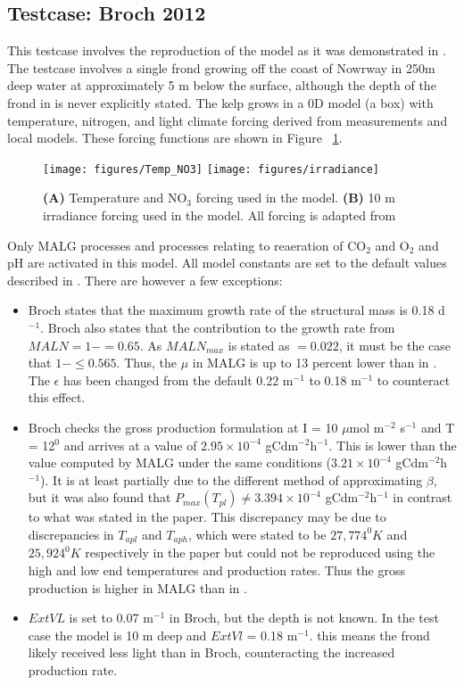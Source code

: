 \documentclass{deltares_manual}
\begin{document}
\subsection{Testcase: Broch 2012}
This testcase involves the reproduction of the model as it was demonstrated in \cite{broch2012}. The testcase involves a single frond growing off the coast of Nowrway in 250m deep water at approximately 5 m below the surface, although the depth of the frond in \cite{broch2012} is never explicitly stated. The kelp grows in a 0D model (a box) with temperature, nitrogen, and light climate forcing derived from measurements and local models. These forcing functions are shown in Figure ~\ref{fig:forcing}.

\begin{figure}[H]
	\centering
	\texttt{[image: figures/Temp\_NO3]}
	\texttt{[image: figures/irradiance]}
	\caption[]{\textbf{(A)} Temperature and NO$_{3}$ forcing used in the model. \textbf{(B)} 10 m irradiance forcing used in the model. All forcing is adapted from \cite{broch2012}}
	\label{fig:forcing}
\end{figure}

Only MALG processes and processes relating to reaeration of CO$_{2}$ and O$_{2}$ and pH are activated in this model. All model constants are set to the default values described in \cite{broch2012}. There are however a few exceptions:
\begin{itemize}
	\item Broch states that the maximum growth rate of the structural mass is 0.18 d$^{-1}$. Broch also states that the contribution to the growth rate from $MALN = 1-  = 0.65$. As $MALN_{max}$ is stated as $= 0.022$, it must be the case that $1- \leq 0.565$. Thus, the $\mu$ in MALG is up to 13 percent lower than in \cite{broch2012}. The $\epsilon$ has been changed from the default 0.22 m$^{-1}$ to 0.18 m$^{-1}$ to counteract this effect.
	\item Broch checks the gross production formulation at I = 10 $\mu$mol m$^{-2}$ s$^{-1}$ and T = 12$^{0}$ and arrives at a value of $2.95 \times 10^{-4}$ gCdm$^{-2}$h$^{-1}$. This is lower than the value computed by MALG under the same conditions ($3.21  \times 10^{-4}$ gCdm$^{-2}$h$^{-1}$). It is at least partially due to the different method of approximating $\beta$, but it was also found that $P_{max}(T_{pl}) \neq 3.394  \times 10^{-4}$ gCdm$^{-2}$h$^{-1}$ in contrast to what was stated in the paper. This discrepancy may be due to discrepancies in $T_{apl}$ and $T_{aph}$, which were stated to be $27,774^{0}K$ and $25,924^{0}K$ respectively in the paper but could not be reproduced using the high and low end temperatures and production rates. Thus the gross production is higher in MALG than in \cite{broch2012}.
	\item $ExtVL$ is set to 0.07 m$^{-1}$ in Broch, but the depth is not known. In the test case the model is 10 m deep and $ExtVl$ = 0.18 m$^{-1}$. this means the frond likely received less light than in Broch, counteracting the increased production rate.
\end{itemize}
\end{document}
